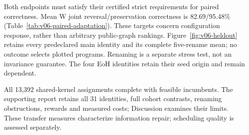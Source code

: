 Both endpoints must satisfy their certified strict requirements for paired
correctness. Mean W joint reversal/preservation correctness is
82.69/95.48\% (Table~\ref{tab:v06-paired-adaptation}). These targets concern
configuration response, rather than arbitrary public-graph rankings.
Figure~\ref{fig:v06-heldout} retains every predeclared main
identity and its complete five-rename mean; no outcome selects plotted
programs. Renaming is a separate stress test, not an invariance guarantee.
The four EoH identities retain their seed origin and remain dependent.



All 13,392 shared-kernel assignments complete with feasible incumbents.
The supporting report retains all 31 identities, full cohort contrasts,
renaming obstructions, rewards and measured costs; Discussion examines their
limits. These transfer measures characterize information repair; scheduling
quality is assessed separately.

